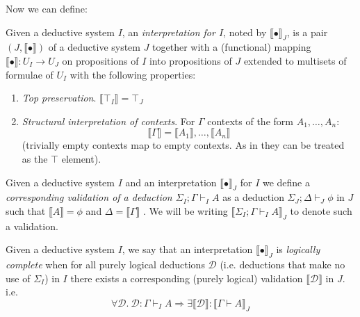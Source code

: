 Now we can define: 
\begin{definition}Given a deductive system $I$, an   \textit{interpretation for $I$}, noted by $\llbracket\bullet \rrbracket_J$, is a pair
	$(J,\llbracket\bullet\rrbracket)$ of a deductive  system $J$ together
	with a (functional) mapping $\llbracket \bullet \rrbracket: U_I\rightarrow U_J$ on propositions of $I$ into propositions of $J$ extended to multisets of 
	formulae of $U_I$ with the following properties:
	\begin{enumerate}
		\item \textit{Top preservation}. $\llbracket\top_I \rrbracket = \top_J$
		\item \textit{Structural interpretation of contexts}. For  $\Gamma$ contexts of the form $A_1,\ldots, A_n$:
		$$\llbracket\Gamma \rrbracket=\llbracket A_1  \rrbracket,\ldots,  \llbracket A_n\rrbracket$$ (trivially empty contexts map to empty contexts. 
		As in \cite{Lambek1968} they can be treated as 
		the $\top$ element).
	\end{enumerate}
\end{definition}
\begin{definition}Given a deductive system $I$  and an  interpretation $\llbracket\bullet\rrbracket_J$ for $I$ we define
	a \textit{corresponding validation of a deduction $\Sigma_I;\Gamma\vdash_I A$}  
	as a deduction $\Sigma_J;\Delta\vdash_{J} \phi$ in $J$ such that $\llbracket A \rrbracket=\phi$ and $\Delta=\llbracket \Gamma \rrbracket $ . We will be writing
	$ \llbracket \Sigma_I;\Gamma\vdash_I A\rrbracket_J$ to denote such a validation.
\end{definition}
\begin{definition}
	Given a deductive system $I$, we say that an interpretation  $\llbracket\bullet \rrbracket_J$  is \textit{logically complete} when  for
	all purely logical deductions $\mathcal{D}$ (i.e. deductions that make no use of $\Sigma_I$) in $I$ 
	there exists a corresponding (purely logical) validation $\llbracket\mathcal{D}\rrbracket$ in $J$.
	i.e. $$\forall \mathcal{D}. \ \mathcal{D}:\Gamma\vdash_I A \Longrightarrow \exists \llbracket\mathcal{D}\rrbracket: \llbracket \Gamma\vdash A\rrbracket_J$$
\end{definition}
